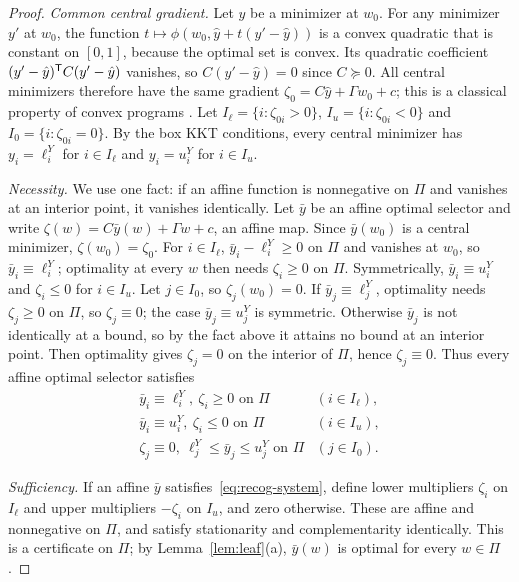 \begin{proof}
\emph{Common central gradient.} Let $\hat y$ be a minimizer at $w_0$. For
any minimizer $y'$ at $w_0$, the function
$t\mapsto\phi(w_0,\hat y+t(y'-\hat y))$ is a convex quadratic that is
constant on $[0,1]$, because the optimal set is convex. Its quadratic
coefficient $(y'-\hat y)^{\mathsf T}C(y'-\hat y)$ vanishes, so $C(y'-\hat y)=0$
since $C\succeq0$. All central minimizers therefore have the same gradient
$\zeta_0=C\hat y+\Gamma w_0+c$; this is a classical property of convex
programs \cite{Mangasarian1988}. Let $I_\ell=\{i:\zeta_{0i}>0\}$,
$I_u=\{i:\zeta_{0i}<0\}$ and $I_0=\{i:\zeta_{0i}=0\}$. By the box KKT
conditions, every central minimizer has $y_i=\ell^Y_i$ for $i\in I_\ell$ and
$y_i=u^Y_i$ for $i\in I_u$.

\emph{Necessity.} We use one fact: if an affine function is nonnegative on
$\Pi$ and vanishes at an interior point, it vanishes identically. Let $\bar y$
be an affine optimal selector and write $\zeta(w)=C\bar y(w)+\Gamma w+c$, an
affine map. Since $\bar y(w_0)$ is a central minimizer, $\zeta(w_0)=\zeta_0$.
For $i\in I_\ell$, $\bar y_i-\ell^Y_i\ge0$ on $\Pi$ and vanishes at $w_0$,
so $\bar y_i\equiv\ell^Y_i$; optimality at every $w$ then needs
$\zeta_i\ge0$ on $\Pi$. Symmetrically, $\bar y_i\equiv u^Y_i$ and
$\zeta_i\le0$ for $i\in I_u$. Let $j\in I_0$, so $\zeta_j(w_0)=0$. If
$\bar y_j\equiv\ell^Y_j$, optimality needs $\zeta_j\ge0$ on $\Pi$, so
$\zeta_j\equiv0$; the case $\bar y_j\equiv u^Y_j$ is symmetric. Otherwise
$\bar y_j$ is not identically at a bound, so by the fact above it attains no
bound at an interior point. Then optimality gives $\zeta_j=0$ on the interior
of $\Pi$, hence $\zeta_j\equiv0$. Thus every affine optimal selector
satisfies
\begin{equation}\label{eq:recog-system}
\begin{array}{ll}
\bar y_i\equiv\ell^Y_i,\ \zeta_i\ge0\text{ on }\Pi & (i\in I_\ell),\\
\bar y_i\equiv u^Y_i,\ \zeta_i\le0\text{ on }\Pi & (i\in I_u),\\
\zeta_j\equiv0,\ \ell^Y_j\le\bar y_j\le u^Y_j\text{ on }\Pi & (j\in I_0).
\end{array}
\end{equation}

\emph{Sufficiency.} If an affine $\bar y$ satisfies~\eqref{eq:recog-system},
define lower multipliers $\zeta_i$ on $I_\ell$ and upper multipliers
$-\zeta_i$ on $I_u$, and zero otherwise. These are affine and nonnegative on
$\Pi$, and satisfy stationarity and complementarity identically. This is a
certificate on $\Pi$; by Lemma~\ref{lem:leaf}(a), $\bar y(w)$ is optimal for
every $w\in\Pi$.


\end{proof}
